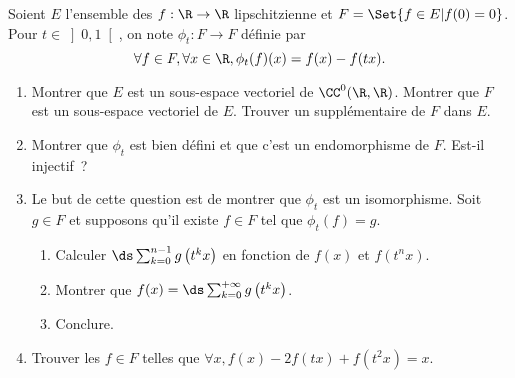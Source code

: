 \begin{enonce}
\begin{exercise}[ID={RMS124 E330 X-ENS PSI},subtitle={},tags={}, difficulty={0}]
Soient $E$ l'ensemble des $f:\R\to\R$ lipschitzienne et $F=\Set{f\in E| f(0) = 0}$.
Pour $t\in\left]0,1\right[$, on note $\phi_t : F\to F$ définie par
\begin{equation*}
  \forall f\in F, \forall x\in\R, \phi_t(f)(x) = f(x) - f(tx).
\end{equation*}
\begin{enumerate}
  \item Montrer que $E$ est un sous-espace vectoriel de $\CC^0(\R,\R)$.
    Montrer que $F$ est un sous-espace vectoriel de $E$.
    Trouver un supplémentaire de $F$ dans $E$.
  \item Montrer que $\phi_t$ est bien défini et que c'est un endomorphisme de $F$.
    Est-il injectif~?
  \item Le but de cette question est de montrer que $\phi_t$ est un isomorphisme.
    Soit $g\in F$ et supposons qu'il existe $f\in F$ tel que $\phi_t(f)=g$.
    \begin{enumerate}
      \item Calculer $\ds\sum_{k=0}^{n-1} g\left( t^kx \right)$ en fonction de $f(x)$ et $f(t^n x)$.
      \item Montrer que $f(x)=\ds\sum_{k=0}^{+\infty} g\left( t^k x \right)$.
      \item Conclure.
    \end{enumerate}
  \item Trouver les $f\in F$ telles que 
    \begin{math} \forall x, f(x) - 2f(tx) + f(t^2x) = x \end{math}.
\end{enumerate}
\end{exercise}
\begin{solution}
\end{solution}
\end{enonce}
